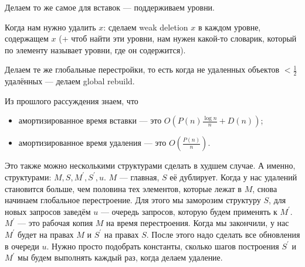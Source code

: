 Делаем то же самое для вставок — поддерживаем уровни.

Когда нам нужно удалить $x$: сделаем weak deletion $x$ в каждом уровне, содержащем $x$ (+ чтоб найти эти уровни, нам нужен какой-то словарик, который по элементу называет уровни, где он содержится).

Делаем те же глобальные перестройки, то есть когда не удаленных объектов $<\frac{1}{2}$ удалённых — делаем global rebuild.

Из прошлого рассуждения знаем, что
\begin{itemize}
    \item амортизированное время вставки — это $O\left(P(n)\frac{\log n}{n}+D(n)\right)$;
    \item амортизированное время удаления — это $O\left(\frac{P(n)}{n}\right)$.
\end{itemize}

Это также можно несколькими структурами сделать в худшем случае. А именно, структурами: $M,S,M^\prime,S^\prime,u$. $M$ — главная, $S$ её дублирует. Когда у нас удалений становится больше, чем половина тех элементов, которые лежат в $M$, снова начинаем глобальное перестроение. Для этого мы заморозим структуру $S$, для новых запросов заведём $ u$ — очередь запросов, которую будем применять к $M^\prime$. $M^\prime$ — это рабочая копия $M$ на время перестроения. Когда мы закончили, у нас $M^\prime$ будет на правах $M$ и $S^\prime$ на правах $S$. После этого надо сделать все обновления в очереди $u$. Нужно просто подобрать константы, сколько шагов построения $S^\prime$ и $M^\prime$ мы будем выполнять каждый раз, когда делаем удаление.